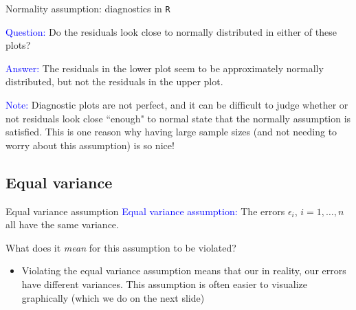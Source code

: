 \documentclass[10pt,t]{beamer}
\begin{document}
\begin{frame}{Normality assumption: diagnostics in \texttt{R}}

\textcolor{blue}{Question:} Do the residuals look close to normally distributed in either of these plots?

\vspace{0.3cm}

\textcolor{blue}{Answer:} The residuals in the lower plot seem to be approximately normally distributed, but not the residuals in the upper plot.

\vspace{0.3cm}

\textcolor{blue}{Note:} Diagnostic plots are not perfect, and it can be difficult to judge whether or not residuals look close ``enough" to normal state that the normally assumption is satisfied. This is one reason why having large sample sizes (and not needing to worry about this assumption) is so nice!

\end{frame}

\subsection{Equal variance}

\begin{frame}{Equal variance assumption}
\textcolor{blue}{Equal variance assumption:} The errors $\epsilon_i$, $i = 1, \dots, n$ all have the same variance.

\vspace{0.3cm}

What does it \textit{mean} for this assumption to be violated?

\begin{itemize}
	\item[] Violating the equal variance assumption means that our in reality, our errors have different variances. This assumption is often easier to visualize graphically (which we do on the next slide)
\end{itemize}

\end{frame}
\end{document}
